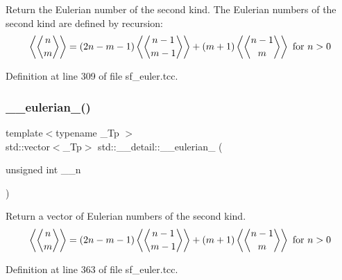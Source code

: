 Return the Eulerian number of the second kind. The Eulerian numbers of the second kind are defined by recursion\+: \[ \left\langle\genfrac{\langle}{\rangle}{0pt}{0}{n}{m}\right\rangle = (2n-m-1) \left\langle\genfrac{\langle}{\rangle}{0pt}{0}{n-1}{m-1}\right\rangle + (m+1) \left\langle\genfrac{\langle}{\rangle}{0pt}{0}{n-1}{m}\right\rangle \mbox{ for } n > 0 \] 

Definition at line 309 of file sf\+\_\+euler.\+tcc.

\mbox{\label{namespacestd_1_1____detail_a9c1abae84b487289ce8f798bcfe4b7e0}} 
\subsubsection{\texorpdfstring{\+\_\+\+\_\+eulerian\+\_()}{\_\_eulerian\_2()}\hspace{0.1cm}{\footnotesize\ttfamily [2/2]}}
{\footnotesize\ttfamily template$<$typename \+\_\+\+Tp $>$ \\
std\+::vector$<$\+\_\+\+Tp$>$ std\+::\+\_\+\+\_\+detail\+::\+\_\+\+\_\+eulerian\+\_ (\begin{DoxyParamCaption}\item[{unsigned int}]{\+\_\+\+\_\+n }\end{DoxyParamCaption})\hspace{0.3cm}{\ttfamily [inline]}}

Return a vector of Eulerian numbers of the second kind. \[ \left\langle\genfrac{\langle}{\rangle}{0pt}{0}{n}{m}\right\rangle = (2n-m-1) \left\langle\genfrac{\langle}{\rangle}{0pt}{0}{n-1}{m-1}\right\rangle + (m+1) \left\langle\genfrac{\langle}{\rangle}{0pt}{0}{n-1}{m}\right\rangle \mbox{ for } n > 0 \] 

Definition at line 363 of file sf\+\_\+euler.\+tcc.

\mbox{\label{namespacestd_1_1____detail_a8a2a09c66c530759ae98ac1f3c1d93e5}} 
